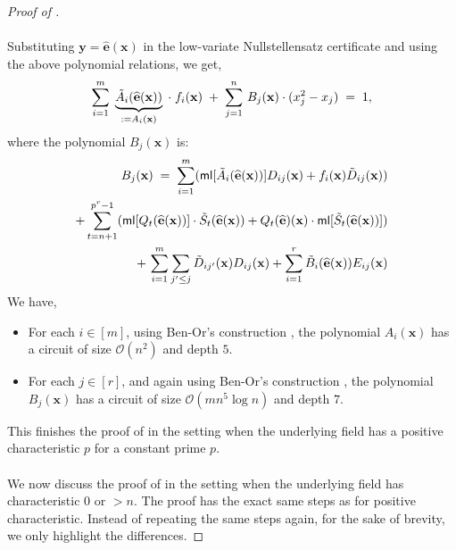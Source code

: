 \documentclass[11pt]{article}
\newcommand{\bigO}{\mathcal{O}}
\newcommand{\ml}{\mathsf{ml}}
\begin{document}
\begin{proof}[Proof of ]
\paragraph{}Substituting $\mathbf{y} = \widehat{\mathbf{e}}(\mathbf{x})$ in the low-variate Nullstellensatz certificate  and using the above polynomial relations, we get,
\begin{align*}
    \sum_{i = 1}^{m} \; \underbrace{\Tilde{A}_{i}(\widehat{\mathbf{e}}(\mathbf{x}))}_{:= A_{i}(\mathbf{x})} \; \cdot \; f_{i}(\mathbf{x}) \; + \; \sum_{j = 1}^{n} \, B_{j}(\mathbf{x}) \cdot (x_{j}^{2} - x_{j}) \; = \; 1, 
\end{align*}
where the polynomial $B_{j}(\mathbf{x})$ is:
\begin{align*}
    B_{j}(\mathbf{x}) \; = \;  \sum_{i = 1}^{m} (\ml[\Tilde{A}_{i}(\widehat{\mathbf{e}}(\mathbf{x}))] D_{ij}(\mathbf{x}) + f_{i}(\mathbf{x}) \Tilde{D}_{ij}(\mathbf{x})) \\ + \sum_{t=n+1}^{p^{r}-1} (\ml[Q_{t}(\widehat{\mathbf{e}}(\mathbf{x}))] \cdot \Tilde{S}_{t}(\widehat{\mathbf{e}}(\mathbf{x})) + Q_{t}(\widehat{\mathbf{e}})(\mathbf{x}) \cdot \ml[\Tilde{S}_{t}(\widehat{\mathbf{e}}(\mathbf{x}))]) \\ + \, \sum_{i = 1}^{m} \sum_{j' \leq j} \Tilde{D}_{ij'}(\mathbf{x}) D_{ij}(\mathbf{x}) + \sum_{i=1}^{r} \Tilde{B}_{i}(\widehat{\mathbf{e}}(\mathbf{x})) E_{ij}(\mathbf{x})
\end{align*}
We have,
\begin{itemize}
    \item For each $i \in [m]$, using Ben-Or's construction , the polynomial $A_{i}(\mathbf{x})$ has a circuit of size $\bigO(n^{2})$ and depth $5$.
    \item For each $j \in [r]$, and again using Ben-Or's construction , the polynomial $B_{j}(\mathbf{x})$ has a circuit of size $\bigO(m n^{5} \log n)$ and depth $7$.
\end{itemize}
This finishes the proof of  in the setting when the underlying field has a positive characteristic $p$ for a constant prime $p$.

\paragraph{}We now discuss the proof of  in the setting when the underlying field has characteristic $0$ or $> n$. The proof has the exact same steps as for positive characteristic. Instead of repeating the same steps again, for the sake of brevity, we only highlight the differences.


\end{proof}
\end{document}
